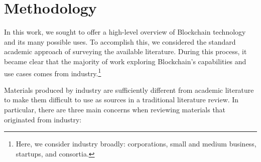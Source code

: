 
\section{Methodology}
\label{sec:method}

In this work, we sought to offer a high-level overview of Blockchain technology and its many possible uses.  To accomplish this, we considered the standard academic approach of surveying the available literature. During this process, it became clear that the majority of work exploring Blockchain's capabilities and use cases comes from industry.\footnote{Here, we consider industry broadly: corporations, small and medium business, startups, and consortia.}

Materials produced by industry are sufficiently different from academic literature to make them difficult to use as sources in a traditional literature review.
In particular, there are three main concerns when reviewing materials that originated from industry:

